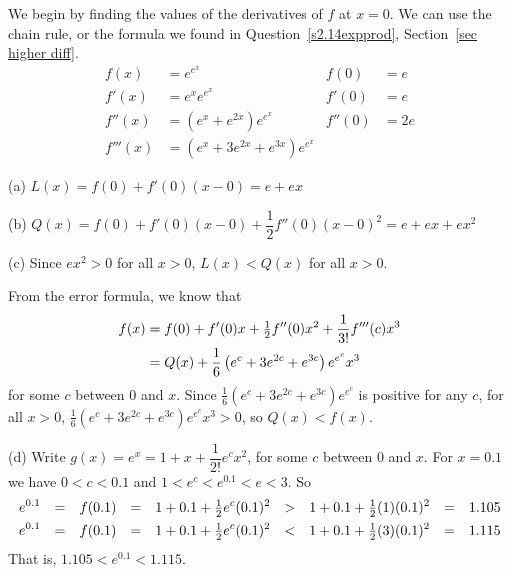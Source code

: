 \begin{solution}
We begin by finding the values of the derivatives of $f$ at $x=0$. We can use the chain rule, or the formula we found in Question~\ref{s2.14expprod}, Section~\ref*{sec higher diff}.%
\begin{align*}
f(x)&=e^{e^x}&f(0)&=e\\
f'(x)&=e^xe^{e^x}&f'(0)&=e\\
f''(x)&=\left(e^x+e^{2x}\right)e^{e^x}&f''(0)&=2e\\
f'''(x)&=\left(e^x+3e^{2x}+e^{3x}\right)e^{e^x}
\end{align*}

(a) $L(x)=f(0)+f'(0)(x-0)=e+ex$

(b) $Q(x)=f(0)+f'(0)(x-0)+\dfrac{1}{2}f''(0)(x-0)^2=e+ex+ex^2$

(c) Since $ex^2 >0$ for all $x>0$, $L(x)<Q(x)$ for all $x>0$.

From the error formula, we know that
\begin{align*}
f(x)&=f(0)+f'(0)x+\tfrac{1}{2} f''(0)x^2
+\dfrac{1}{3!}f'''(c)x^{3}\\
&=Q(x)+\frac{1}{6}\left(e^c+3e^{2c}+e^{3c}\right)e^{e^c}x^3
\end{align*}
for some $c$ between $0$ and $x$.
Since $\frac{1}{6}\left(e^c+3e^{2c}+e^{3c}\right)e^{e^c}$ is positive for any $c$, for
all $x>0$,
$\frac{1}{6}\left(e^c+3e^{2c}+e^{3c}\right)e^{e^c}x^3>0$, so
$Q(x)<f(x)$.

(d) Write $g(x)=e^x=1+x+\dfrac{1}{2!}e^c x^2$, for some $c$ between
$0$ and $x$.
For $x=0.1$ we have $0<c<0.1$ and $1<e^c<e^{0.1}<e<3$.
So
\begin{align*}
e^{0.1}&&=&&f(0.1)&&=&&1+0.1+\tfrac{1}{2} e^c (0.1)^2&&>&&1+0.1+\tfrac{1}{2} (1) (0.1)^2&&=&&1.105\\
e^{0.1}&&=&&f(0.1)&&=&&1+0.1+\tfrac{1}{2} e^c (0.1)^2&&<&&1+0.1+\tfrac{1}{2} (3) (0.1)^2&&=&&1.115
\end{align*}
That is, $1.105<e^{0.1}<1.115$.
\end{solution}
